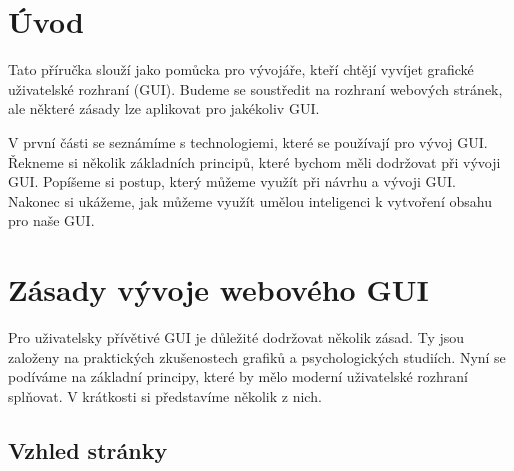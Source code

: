 \section{Úvod}
\label{chap:introduction}

Tato příručka slouží jako pomůcka pro vývojáře, kteří chtějí vyvíjet grafické uživatelské rozhraní (GUI). Budeme se soustředit na rozhraní webových stránek, ale některé zásady lze aplikovat pro jakékoliv GUI.

V první části se seznámíme s technologiemi, které se používají pro vývoj GUI. Řekneme si několik základních principů, které bychom měli dodržovat při vývoji GUI. Popíšeme si postup, který můžeme využít při návrhu a vývoji GUI. Nakonec si ukážeme, jak můžeme využít umělou inteligenci k vytvoření obsahu pro naše GUI.

\section{Zásady vývoje webového GUI}
\label{sec:principles}

Pro uživatelsky přívětivé GUI je důležité dodržovat několik zásad. Ty jsou založeny na praktických zkušenostech grafiků a psychologických studiích. Nyní se podíváme na základní principy, které by mělo moderní uživatelské rozhraní splňovat. V krátkosti si představíme několik z nich.

\subsection{Vzhled stránky}
\label{subsec:visual-principles}

